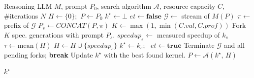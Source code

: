 \begin{algorithm}[t]
\caption{SpecController core loop.}
\label{alg:speclauncher}
\begin{algorithmic}[1]
\Require Reasoning LLM $M$, prompt $P_0$, search algorithm $\mathcal{A}$, resource capacity $C$, \#iterations $N$
\State $H \gets \{0\}$;\, $P \gets P_0$ 
\State $k^{\star} \gets \bot$ 
    \State $et \gets \textbf{false}$ 
    \State $\mathcal{G} \gets$ stream of $M(P)$ 
            \State $\pi \gets$ prefix of $\mathcal{G}$
            \State $P_s \gets CONCAT(P, \pi)$ 
            \State $K \gets \max(1, \min(C.\textit{val}, C.\textit{prof}))$ \label{line:num_spec_gens}
            \State Fork $K$ spec. generations with prompt $P_s$.
        \EndIf
            \State $speedup_s \gets$ measured speedup of $k_s$
            \State $\tau \gets \mathrm{mean}(H)$
            \State $H \gets H \cup \{speedup_s\}$
                \State $k^{\star} \gets k_s$; \, $et \gets \textbf{true}$
                \State Terminate $\mathcal{G}$ and all pending forks;
                \State \textbf{break}
            \EndIf
        \EndFor
    \EndWhile
        \State Update $k^{\star}$ with the best found kernel.
    \EndIf
    \State $P \gets \mathcal{A}(k^{\star},\, H)$ 
\EndFor

\State \Return $k^{\star}$ 

\end{algorithmic}
\end{algorithm}

